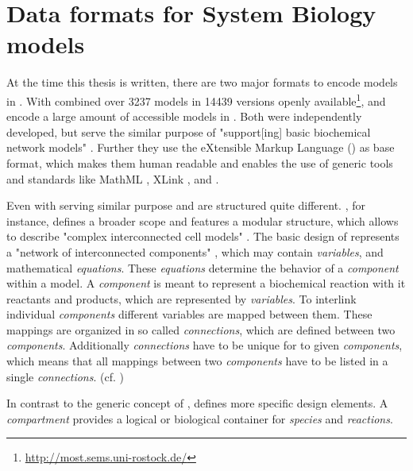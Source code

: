 \section{Data formats for System Biology models}
	\label{sec:background:formats}
	
	At the time this thesis is written, there are two major formats to encode models in \sysbio. With combined over 3237 models in 14439 versions openly available\footnote{\url{http://most.sems.uni-rostock.de/}}, \sbml and \cellml encode a large amount of accessible models in \sysbio.
	Both were independently developed, but serve the similar purpose of "support[ing] basic biochemical network models" \citep{Cuellar2003}. Further they use the eXtensible Markup Language \citep{Bray1998} (\xml) as base format, which makes them human readable and enables the use of generic \xml tools and standards \citep{Cuellar2003,Hucka2003} like MathML \citep{Carlisle2003}, XLink \citep{DeRose2010}, and \rdf \citep{Lassila1998}.
	
	Even with serving similar purpose \sbml and \cellml are structured quite different.
	\cellml, for instance, defines a broader scope and features a modular structure, which allows to describe "complex interconnected cell models" \citep{Cuellar2003}.
	The basic design of \cellml represents a "network of interconnected components" \citep{Cuellar2003}, which may contain \emph{variables}, and mathematical \emph{equations}. These \emph{equations} determine the behavior of a \emph{component} within a model.
	A \emph{component} is meant to represent a biochemical reaction with it reactants and products, which are represented by \emph{variables}.
	To interlink individual \emph{components} different variables are mapped between them. These mappings are organized in so called \emph{connections}, which are defined between two \emph{components}. Additionally \emph{connections} have to be unique for to given \emph{components}, which means that all mappings between two \emph{components} have to be listed in a single \emph{connections}. (cf. \citet{Cuellar2003})
	
	In contrast to the generic concept of \cellml, defines \sbml more specific design elements.
	A \sbml \emph{compartment} provides a logical or biological container for \emph{species} and \emph{reactions}.
	
	

